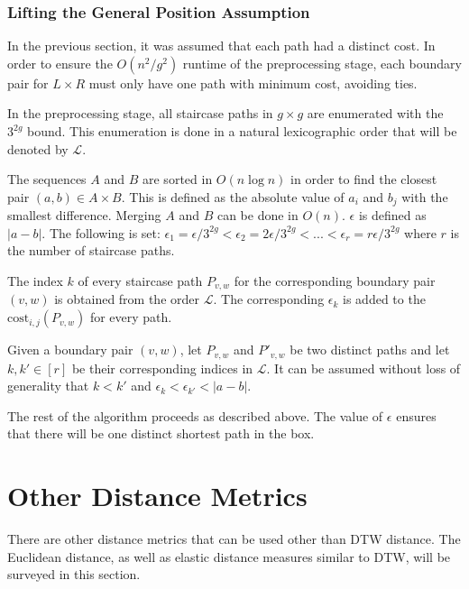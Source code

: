 \subsubsection{Lifting the General Position Assumption}
In the previous section, it was assumed that each path had a distinct cost. In order to ensure the $O(n^2/g^2)$ runtime of the preprocessing stage, each boundary pair for $L \times R$ must only have one path with minimum cost, avoiding ties.

In the preprocessing stage, all staircase paths in $g \times g$ are enumerated with the $3^{2g}$ bound. This enumeration is done in a natural lexicographic order that will be denoted by $\mathcal{L}$.

The sequences $A$ and $B$ are sorted in $O(n\log n)$ in order to find the closest pair $(a,b) \in A\times B$. This is defined as the absolute value of $a_i$ and $b_j$ with the smallest difference. Merging $A$ and $B$ can be done in $O(n)$. $\epsilon$ is defined as $|a-b|$. The following is set: $\epsilon_1 = \epsilon/3^{2g} < \epsilon_2 = 2\epsilon/3^{2g} < ... < \epsilon_r = r\epsilon/3^{2g}$ where $r$ is the number of staircase paths.

The index $k$ of every staircase path $P_{v,w}$ for the corresponding boundary pair $(v,w)$ is obtained from the order $\mathcal{L}$. The corresponding $\epsilon_k$ is added to the $\text{cost}_{i,j}(P_{v,w})$ for every path.

Given a boundary pair $(v,w)$, let $P_{v,w}$ and $P'_{v,w}$ be two distinct paths and let $k, k' \in [r]$ be their corresponding indices in $\mathcal{L}$. It can be assumed without loss of generality that $k < k'$ and $\epsilon_k < \epsilon_{k'} < |a-b|$.

The rest of the algorithm proceeds as described above. The value of $\epsilon$ ensures that there will be one distinct shortest path in the box.

\section{Other Distance Metrics}
There are other distance metrics that can be used other than DTW distance. The Euclidean distance, as well as elastic distance measures similar to DTW, will be surveyed in this section.

